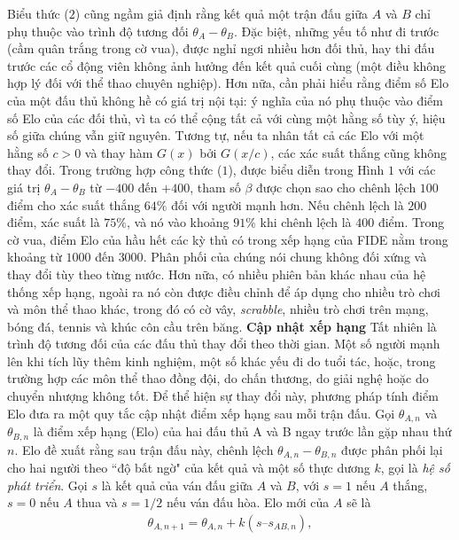 \begin{multicols}{2}
	\vskip 0.05cm
	Biểu thức ($2$) cũng ngầm giả định rằng kết quả một trận đấu giữa $A$ và $B$ chỉ phụ thuộc vào trình độ tương đối $\theta_A - \theta_B$. Đặc biệt, những yếu tố như đi trước (cầm quân trắng trong cờ vua), được nghỉ ngơi nhiều hơn đối thủ, hay thi đấu trước các cổ động viên không ảnh hưởng đến kết quả cuối cùng (một điều không hợp lý đối với thể thao chuyên nghiệp).
	\vskip 0.05cm
	Hơn nữa, cần phải hiểu rằng điểm số Elo của một đấu thủ không hề có giá trị nội tại: ý nghĩa của nó phụ thuộc vào điểm số Elo của các đối thủ, vì ta có thể cộng tất cả với cùng một hằng số tùy ý, hiệu số giữa chúng vẫn giữ nguyên. Tương tự, nếu ta nhân tất cả các Elo với một hằng số $c > 0$ và thay hàm $G(x)$ bởi $G(x / c)$, các xác suất thắng cũng không thay đổi.
	\vskip 0.05cm
	Trong trường hợp công thức ($1$), được biểu diễn trong Hình $1$ với các giá trị $\theta_A - \theta_B$ từ $-400$ đến $+400$, tham số $\beta$ được chọn sao cho chênh lệch $100$ điểm cho xác suất thắng $64\%$ đối với người mạnh hơn. Nếu chênh lệch là $200$ điểm, xác suất là $75\%$, và nó vào khoảng $91\%$ khi chênh lệch là $400$ điểm.
	\vskip 0.05cm
	Trong cờ vua, điểm Elo của hầu hết các kỳ thủ có trong xếp hạng của FIDE nằm trong khoảng từ $1000$ đến $3000$. Phân phối của chúng nói chung không đối xứng và thay đổi tùy theo từng nước. Hơn nữa, có nhiều phiên bản khác nhau của hệ thống xếp hạng, ngoài ra nó còn được điều chỉnh để áp dụng cho nhiều trò chơi và môn thể thao khác, trong đó có cờ vây, \textit{scrabble}, nhiều trò chơi trên mạng, bóng đá, tennis và khúc côn cầu trên băng.
	\vskip 0.05cm
	\textbf{\color{toanhocdoisong}Cập nhật xếp hạng}
	\vskip 0.05cm
	Tất nhiên là trình độ tương đối của các đấu thủ thay đổi theo thời gian. Một số người mạnh lên khi tích lũy thêm kinh nghiệm, một số khác yếu đi do tuổi tác, hoặc, trong trường hợp các môn thể thao đồng đội, do chấn thương, do giải nghệ hoặc do chuyển nhượng không tốt.
	\vskip 0.05cm
	Để thể hiện sự thay đổi này, phương pháp tính điểm Elo đưa ra một quy tắc cập nhật điểm xếp hạng sau mỗi trận đấu. Gọi $\theta_{A, n}$ và $\theta_{B, n}$ là điểm xếp hạng (Elo) của hai đấu thủ A và B ngay trước lần gặp nhau thứ $n$. Elo đề xuất rằng sau trận đấu này, chênh lệch $\theta_{A, n} - \theta_{B, n}$ được phân phối lại cho hai người theo ``độ bất ngờ" của kết quả và một số thực dương $k$, gọi là \textit{hệ số phát triển}.
	\vskip 0.05cm
	Gọi $s$ là kết quả của ván đấu giữa $A$ và $B$, với $s = 1$ nếu $A$ thắng, $s = 0$ nếu $A$ thua và $s = 1/2$ nếu ván đấu hòa. Elo mới của $A$ sẽ là
	\begin{align*}
		\theta_{A, n + 1} = \theta_{A, n} + k (s – s_{AB, n}),

\end{align*}
\end{multicols}
